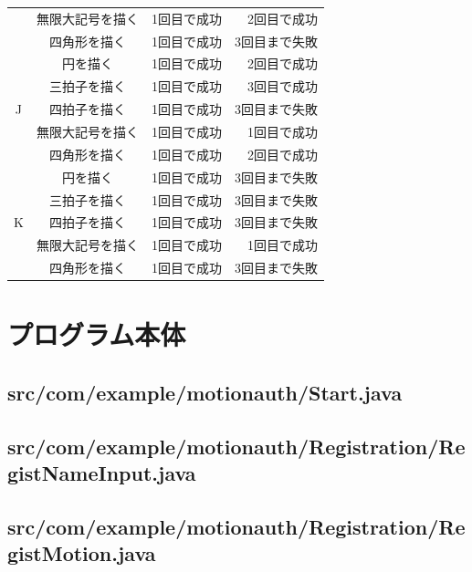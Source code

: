 \documentclass[11pt]{jreport}
\renewcommand{\slash}{/}
\begin{document}
\begin{center}
\begin{longtable}{|c|c|r|r|}
                  & 無限大記号を描く & 1回目で成功 & 2回目で成功 \\ \cline{2-4}
                  & 四角形を描く & 1回目で成功 & 3回目まで失敗 \\ \hline %
                  & 円を描く & 1回目で成功 & 2回目で成功 \\ \cline{2-4} %
                  & 三拍子を描く & 1回目で成功 & 3回目で成功 \\ \cline{2-4}
                J & 四拍子を描く & 1回目で成功 & 3回目まで失敗 \\ \cline{2-4}
                  & 無限大記号を描く & 1回目で成功 & 1回目で成功 \\ \cline{2-4}
                  & 四角形を描く & 1回目で成功 & 2回目で成功 \\ \hline %
                  & 円を描く & 1回目で成功 & 3回目まで失敗 \\ \cline{2-4}
                  & 三拍子を描く & 1回目で成功 & 3回目まで失敗 \\ \cline{2-4}
                K & 四拍子を描く & 1回目で成功 & 3回目まで失敗 \\ \cline{2-4}
                  & 無限大記号を描く & 1回目で成功 & 1回目で成功 \\ \cline{2-4}
                  & 四角形を描く & 1回目で成功 & 3回目まで失敗 \\ \hline
            \end{longtable}
        \end{center}

\chapter{プログラム本体}
    \section{src\slash com\slash example\slash motionauth\slash Start.java}
    
    \section{src\slash com\slash example\slash motionauth\slash Registration\slash RegistNameInput.java}
    

    \section{src\slash com\slash example\slash motionauth\slash Registration\slash RegistMotion.java}
    
\end{document}
